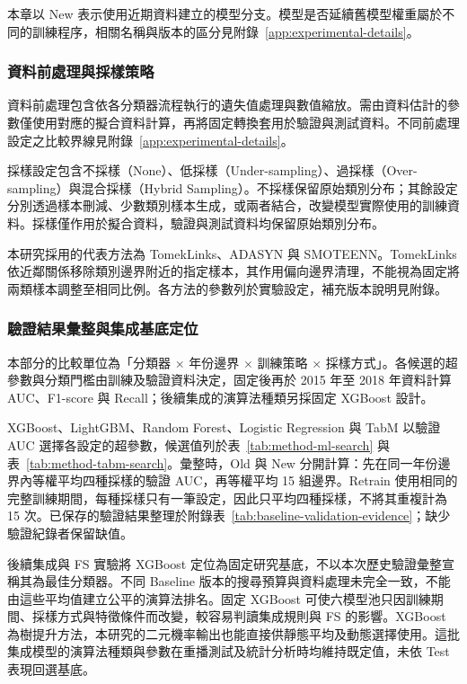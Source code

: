 本章以 New 表示使用近期資料建立的模型分支。模型是否延續舊模型權重屬於不同的訓練程序，相關名稱與版本的區分見附錄~\ref{app:experimental-details}。

\subsubsection{資料前處理與採樣策略}

資料前處理包含依各分類器流程執行的遺失值處理與數值縮放。需由資料估計的參數僅使用對應的擬合資料計算，再將固定轉換套用於驗證與測試資料。不同前處理設定之比較界線見附錄~\ref{app:experimental-details}。

採樣設定包含不採樣（None）、低採樣（Under-sampling）、過採樣（Over-sampling）與混合採樣（Hybrid Sampling）。不採樣保留原始類別分布；其餘設定分別透過樣本刪減、少數類別樣本生成，或兩者結合，改變模型實際使用的訓練資料。採樣僅作用於擬合資料，驗證與測試資料均保留原始類別分布。

本研究採用的代表方法為 TomekLinks、ADASYN 與 SMOTEENN。TomekLinks 依近鄰關係移除類別邊界附近的指定樣本，其作用偏向邊界清理，不能視為固定將兩類樣本調整至相同比例。各方法的參數列於實驗設定，補充版本說明見附錄。

\subsubsection{驗證結果彙整與集成基底定位}

本部分的比較單位為「分類器 \ensuremath{\times} 年份邊界 \ensuremath{\times} 訓練策略 \ensuremath{\times} 採樣方式」。各候選的超參數與分類門檻由訓練及驗證資料決定，固定後再於 2015 年至 2018 年資料計算 AUC、F1-score 與 Recall；後續集成的演算法種類另採固定 XGBoost 設計。

XGBoost、LightGBM、Random Forest、Logistic Regression 與 TabM 以驗證 AUC 選擇各設定的超參數，候選值列於表~\ref{tab:method-ml-search} 與表~\ref{tab:method-tabm-search}。彙整時，Old 與 New 分開計算：先在同一年份邊界內等權平均四種採樣的驗證 AUC，再等權平均 15 組邊界。Retrain 使用相同的完整訓練期間，每種採樣只有一筆設定，因此只平均四種採樣，不將其重複計為 15 次。已保存的驗證結果整理於附錄表~\ref{tab:baseline-validation-evidence}；缺少驗證紀錄者保留缺值。

後續集成與 FS 實驗將 XGBoost 定位為固定研究基底，不以本次歷史驗證彙整宣稱其為最佳分類器。不同 Baseline 版本的搜尋預算與資料處理未完全一致，不能由這些平均值建立公平的演算法排名。固定 XGBoost 可使六模型池只因訓練期間、採樣方式與特徵條件而改變，較容易判讀集成規則與 FS 的影響。XGBoost 為樹提升方法\autocite{chen2016xgboost}，本研究的二元機率輸出也能直接供靜態平均及動態選擇使用。這批集成模型的演算法種類與參數在重播測試及統計分析時均維持既定值，未依 Test 表現回選基底。

